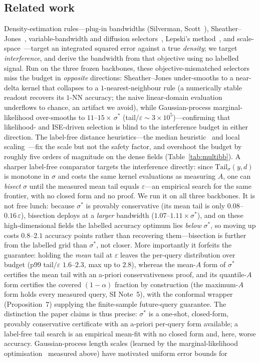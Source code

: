 \documentclass[10pt,twocolumn]{article}
\newcommand{\sstar}{\sigma^{*}}
\begin{document}
\subsection{Related work}\label{sec:related}
Density-estimation rules---plug-in bandwidths (Silverman, Scott~\cite{silverman1986,scott1992}), Sheather--Jones~\cite{sheather1991}, variable-bandwidth and diffusion selectors~\cite{abramson1982,terrell1992,botev2010}, Lepski's method~\cite{lepski1997}, and scale-space~\cite{lindeberg1994}---target an integrated squared error against a true \emph{density}; we target \emph{interference}, and derive the bandwidth from that objective using no labelled signal. Run on the three frozen backbones, these objective-mismatched selectors miss the budget in \emph{opposite} directions: Sheather--Jones under-smooths to a near-delta kernel that collapses to a $1$-nearest-neighbour rule (a numerically stable readout recovers its $1$-NN accuracy; the naive linear-domain evaluation underflows to chance, an artifact we avoid), while Gaussian-process marginal-likelihood over-smooths to $11$--$15\times\,\sstar$ (tail$/\varepsilon\sim3\times10^5$)---confirming that likelihood- and ISE-driven selection is blind to the interference budget in either direction. The label-free distance heuristics---the median heuristic~\cite{garreau2017} and local scaling~\cite{zelnikmanor2004}---fix the scale but not the safety factor, and overshoot the budget by roughly five orders of magnitude on the dense fields (Table~\ref{tab:multibb}). A sharper label-free comparator targets the interference directly: since $\mathrm{Tail}_\sigma(y,d)$ is monotone in $\sigma$ and costs the same kernel evaluations as measuring $A$, one can \emph{bisect} $\sigma$ until the measured mean tail equals $\varepsilon$---an empirical search for the same frontier, with no closed form and no proof. We run it on all three backbones. It is not free lunch: because $\sstar$ is provably conservative (its mean tail is only $0.08$--$0.16\,\varepsilon$), bisection deploys at a \emph{larger} bandwidth ($1.07$--$1.11\times\sstar$), and on these high-dimensional fields the labelled accuracy optimum lies \emph{below} $\sstar$, so moving up costs $0.8$--$2.1$ accuracy points rather than recovering them---bisection is further from the labelled grid than $\sstar$, not closer. More importantly it forfeits the guarantee: holding the \emph{mean} tail at $\varepsilon$ leaves the per-query distribution over budget (p99 tail$/\varepsilon$ $1.6$--$2.3$, max up to $2.8$), whereas the mean-$A$ form of $\sstar$ certifies the mean tail with an a-priori conservativeness proof, and its quantile-$A$ form certifies the covered $(1-\alpha)$ fraction by construction (the maximum-$A$ form holds every measured query, SI Note~5), with the conformal wrapper (Proposition~7) supplying the finite-sample future-query guarantee. The distinction the paper claims is thus precise: $\sstar$ is a one-shot, closed-form, provably conservative certificate with an a-priori per-query form available; a label-free tail search is an empirical mean-fit with no closed form and, here, worse accuracy. Gaussian-process length scales (learned by the marginal-likelihood optimisation~\cite{gpml} measured above) have motivated uniform error bounds for 
\end{document}
